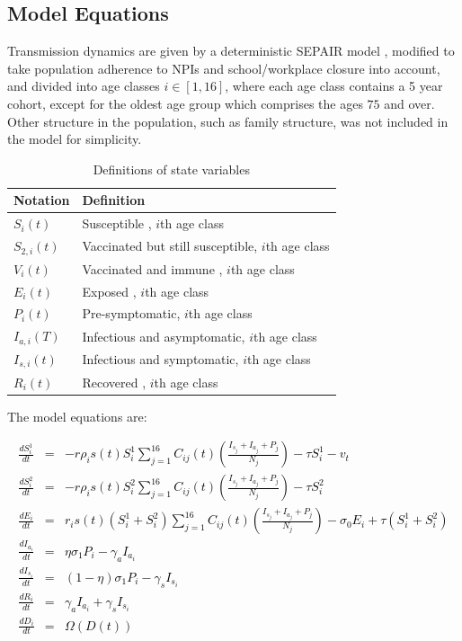 \subsection{Model Equations}
 
Transmission dynamics are given by a deterministic SEPAIR model \cite{wu2006reducing}, modified to take population adherence to NPIs and school/workplace closure into account, and divided into age classes $i \in [1,16]$, where each age class contains a 5 year cohort, except for the oldest age group which comprises the ages $75$ and over. Other structure in the population, such as family structure, was not included in the model for simplicity. 

\begin{table}
  \centering
   \caption{Definitions of state variables}
   \begin{tabular}{l | l}
      Notation & Definition \\
      \hline
      $S_i(t)$ & Susceptible , $i$th age class\\
      $S_{2,i}(t)$ & Vaccinated but still susceptible, $i$th age class\\
      $V_i(t)$ & Vaccinated and immune , $i$th age class\\
      $E_i(t)$ & Exposed , $i$th age class\\
      $P_i(t)$ & Pre-symptomatic, $i$th age class\\
      $I_{a,i}(T)$ & Infectious and asymptomatic, $i$th age class\\
      $I_{s,i}(t)$ & Infectious and symptomatic, $i$th age class\\
      $R_i(t)$ & Recovered , $i$th age class\\
   \end{tabular} 
\end{table}

The model equations are:

\textcolor{black}{\begin{eqnarray}
  \frac{dS^1_i}{dt} &= & - r \rho_i s(t) S^1_i \sum_{j=1}^{16} C_{ij}(t) \left(\frac{I_{s_j} + I_{a_j} + P_j}{N_j}\right) - \tau S^1_i - v_t \label{S1eqn} \\
  \frac{dS^2_i}{dt} &= & - r \rho_i s(t) S^2_i \sum_{j=1}^{16} C_{ij}(t) \left(\frac{I_{s_j} + I_{a_j}+ P_j}{N_j}\right)  - \tau S^2_i \label{S2eqn} \\
  \frac{dE_i}{dt} &= &  r_i s(t) (S^1_i + S^2_i) \sum_{j=1}^{16} C_{ij}(t) \left(\frac{I_{s_j} + I_{a_j}+ P_j}{N_j}\right) - \sigma_0 E_i + \tau (S^1_i + S^2_i)\label{Eeqn} \\
  \frac{dI_{a_i}}{dt} &= & \eta \sigma_1 P_i - \gamma_a I_{a_i}\label{Ieqn} \\
  \frac{dI_{s_i}}{dt} &= & (1 - \eta) \sigma_1 P_i - \gamma_s I_{s_i} \label{Ieqn} \\
\frac{dR_i}{dt} &= & \gamma_a I_{a_i} + \gamma_s I_{s_i}  \label{Reqn} \\
\frac{dD_i}{dt} &= & \Omega(D(t)) \label{Deqn}
\end{eqnarray}}

